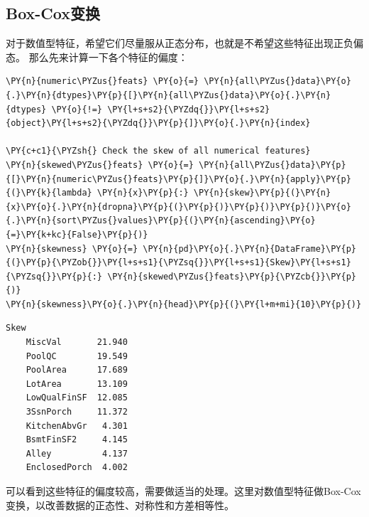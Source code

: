 \documentclass[no-math]{YangThesis}
\begin{document}
\hypertarget{box-coxux53d8ux6362}{%
	\subsection{Box-Cox变换}\label{box-coxux53d8ux6362}}

对于数值型特征，希望它们尽量服从正态分布，也就是不希望这些特征出现正负偏态。
那么先来计算一下各个特征的偏度：

\begin{tcolorbox}[breakable, size=fbox, boxrule=1pt, pad at break*=1mm,colback=cellbackground, colframe=cellborder]
	\begin{Verbatim}[commandchars=\\\{\}]
\PY{n}{numeric\PYZus{}feats} \PY{o}{=} \PY{n}{all\PYZus{}data}\PY{o}{.}\PY{n}{dtypes}\PY{p}{[}\PY{n}{all\PYZus{}data}\PY{o}{.}\PY{n}{dtypes} \PY{o}{!=} \PY{l+s+s2}{\PYZdq{}}\PY{l+s+s2}{object}\PY{l+s+s2}{\PYZdq{}}\PY{p}{]}\PY{o}{.}\PY{n}{index}

\PY{c+c1}{\PYZsh{} Check the skew of all numerical features}
\PY{n}{skewed\PYZus{}feats} \PY{o}{=} \PY{n}{all\PYZus{}data}\PY{p}{[}\PY{n}{numeric\PYZus{}feats}\PY{p}{]}\PY{o}{.}\PY{n}{apply}\PY{p}{(}\PY{k}{lambda} \PY{n}{x}\PY{p}{:} \PY{n}{skew}\PY{p}{(}\PY{n}{x}\PY{o}{.}\PY{n}{dropna}\PY{p}{(}\PY{p}{)}\PY{p}{)}\PY{p}{)}\PY{o}{.}\PY{n}{sort\PYZus{}values}\PY{p}{(}\PY{n}{ascending}\PY{o}{=}\PY{k+kc}{False}\PY{p}{)}
\PY{n}{skewness} \PY{o}{=} \PY{n}{pd}\PY{o}{.}\PY{n}{DataFrame}\PY{p}{(}\PY{p}{\PYZob{}}\PY{l+s+s1}{\PYZsq{}}\PY{l+s+s1}{Skew}\PY{l+s+s1}{\PYZsq{}}\PY{p}{:} \PY{n}{skewed\PYZus{}feats}\PY{p}{\PYZcb{}}\PY{p}{)}
\PY{n}{skewness}\PY{o}{.}\PY{n}{head}\PY{p}{(}\PY{l+m+mi}{10}\PY{p}{)}
	\end{Verbatim}
\end{tcolorbox}

\begin{tcolorbox}[breakable, size=fbox, boxrule=.5pt, pad at break*=1mm, opacityfill=0]
	\begin{Verbatim}[commandchars=\\\{\}]
	Skew
	MiscVal       21.940
	PoolQC        19.549
	PoolArea      17.689
	LotArea       13.109
	LowQualFinSF  12.085
	3SsnPorch     11.372
	KitchenAbvGr   4.301
	BsmtFinSF2     4.145
	Alley          4.137
	EnclosedPorch  4.002
	\end{Verbatim}
\end{tcolorbox}

可以看到这些特征的偏度较高，需要做适当的处理。这里对数值型特征做Box-Cox变换，以改善数据的正态性、对称性和方差相等性。
\end{document}
